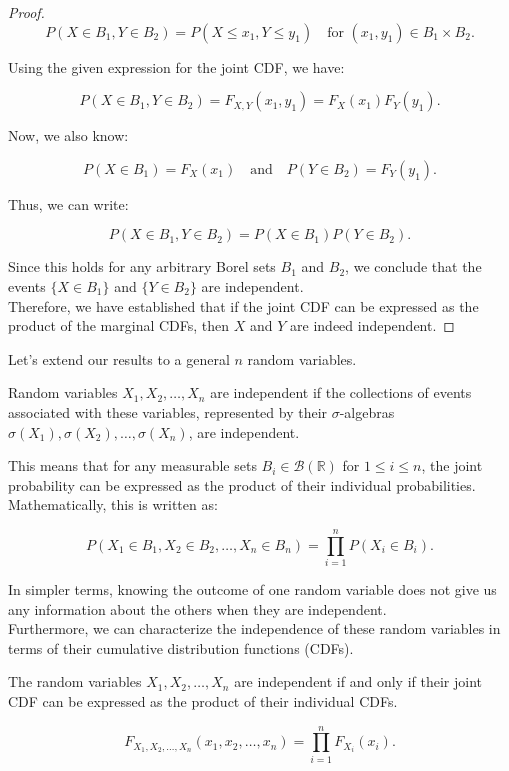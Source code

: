 \begin{proof}
\[
P(X \in B_1, Y \in B_2) = P(X \leq x_1, Y \leq y_1) \quad \text{for } (x_1, y_1) \in B_1 \times B_2.
\]

Using the given expression for the joint CDF, we have:

\[
P(X \in B_1, Y \in B_2) = F_{X,Y}(x_1, y_1) = F_X(x_1) F_Y(y_1).
\]

Now, we also know:

\[
P(X \in B_1) = F_X(x_1) \quad \text{and} \quad P(Y \in B_2) = F_Y(y_1).
\]

Thus, we can write:

\[
P(X \in B_1, Y \in B_2) = P(X \in B_1) P(Y \in B_2).
\]

Since this holds for any arbitrary Borel sets \(B_1\) and \(B_2\), we conclude that the events \( \{X \in B_1\} \) and \( \{Y \in B_2\} \) are independent. \\

Therefore, we have established that if the joint CDF can be expressed as the product of the marginal CDFs, then \(X\) and \(Y\) are indeed independent.

\end{proof}

Let's extend our results to a general $n$ random variables. 

\begin{definition}    
Random variables \(X_1, X_2, \ldots, X_n\) are independent if the collections of events associated with these variables, represented by their \(\sigma\)-algebras \(\sigma(X_1), \sigma(X_2), \ldots, \sigma(X_n)\), are independent.
\end{definition}

This means that for any measurable sets \(B_i \in \mathcal{B}(\mathbb{R})\) for \(1 \leq i \leq n\), the joint probability can be expressed as the product of their individual probabilities. Mathematically, this is written as:

\[
P(X_1 \in B_1, X_2 \in B_2, \ldots, X_n \in B_n) = \prod_{i=1}^{n} P(X_i \in B_i).
\]

In simpler terms, knowing the outcome of one random variable does not give us any information about the others when they are independent.\\

Furthermore, we can characterize the independence of these random variables in terms of their cumulative distribution functions (CDFs). 

\begin{theorem}
    The random variables \(X_1, X_2, \ldots, X_n\) are independent if and only if their joint CDF can be expressed as the product of their individual CDFs. 

\[
F_{X_1, X_2, \ldots, X_n}(x_1, x_2, \ldots, x_n) = \prod_{i=1}^{n} F_{X_i}(x_i).
\]
\end{theorem}


